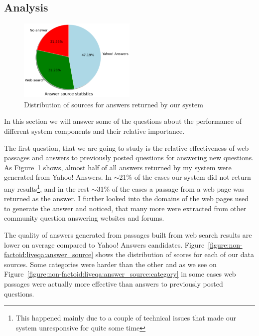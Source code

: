 \subsection{Analysis}
\label{section:non-factoid:liveqa:analysis}

\begin{figure}
	\centering
	\includegraphics[width=0.5\textwidth]{img/liveqa_answer_source}
	\caption{Distribution of sources for answers returned by our system}
	\label{figure:non-factoid:liveqa:answer_source_pie}
\end{figure}

In this section we will answer some of the questions about the performance of different system components and their relative importance.

The first question, that we are going to study is the relative effectiveness of web passages and answers to previously posted questions for answering new questions.
As Figure~\ref{figure:non-factoid:liveqa:answer_source_pie} shows, almost half of all answers returned by my system were generated from Yahoo! Answers.
In $\sim$21\% of the cases our system did not return any results\footnote{This happened mainly due to a couple of technical issues that made our system unresponsive for quite some time}, and in the rest $\sim$31\% of the cases a passage from a web page was returned as the answer.
I further looked into the domains of the web pages used to generate the answer and noticed, that many more were extracted from other community question answering websites and forums.

The quality of answers generated from passages built from web search results are lower on average compared to Yahoo! Answers candidates.
Figure~\ref{figure:non-factoid:liveqa:answer_source} shows the distribution of scores for each of our data sources.
Some categories were harder than the other \cite{overviewliveqa15} and as we see on Figure~\ref{figure:non-factoid:liveqa:answer_source:category} in some cases web passages were actually more effective than answers to previously posted questions.

